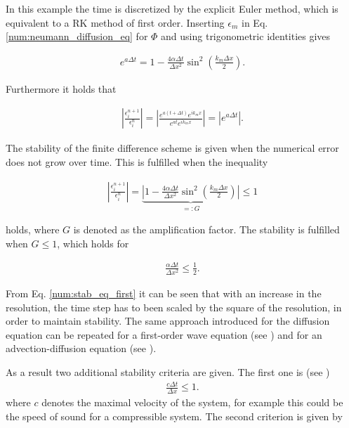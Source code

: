 In this example the time is discretized by the explicit Euler method, which is equivalent to a RK method of first order.
Inserting $\epsilon_m$ in Eq. \ref{num:neumann_diffusion_eq} for $\Phi$ and using trigonometric identities  gives

\begin{align}
    e^{a \Delta t} = 1 -  \frac{4\alpha \Delta t}{\Delta x^2} \sin^2\left(\frac{k_m \Delta x}{2}\right).
\end{align}

Furthermore it holds that

\begin{align}
    \left|\frac{\epsilon_i^{n+1}}{\epsilon_i^n}\right| =
    \left|\frac{e^{a(t + \Delta t)}e^{ik_mx}}{ e^{at}e^{ik_m x}}\right| = \left|e^{a\Delta t}\right|.
\end{align}

The stability of the finite difference scheme is given when the numerical error does not grow over time. This is fulfilled when the inequality

\begin{align}
    \label{num:stab_ineq}
    \left|\frac{\epsilon_i^{n+1}}{\epsilon_i^n}\right| =
    \underbrace{\left|1 -  \frac{4\alpha \Delta t}{\Delta x^2} \sin^2\left(\frac{k_m \Delta x}{2}\right)\right|}_{=:G} \leq 1
\end{align}

holds, where $G$ is denoted as the amplification factor. The stability is fulfilled when $G\leq1$, which holds for

\begin{align}
    \label{num:stab_eq_first}
   \frac{\alpha \Delta t}{\Delta x^2} \leq \frac{1}{2}.
\end{align}

From Eq. \ref{num:stab_eq_first} it can be seen that with an increase in the resolution,
the time step has to been scaled by the square of the resolution, in order to
maintain stability. The same approach introduced for the diffusion equation can be repeated for a first-order wave equation (see \citep{janderson})
and for an advection-diffusion equation (see \citep{ferziger99}).

As a result two additional stability criteria are given.
The first one is (see \citep{janderson})
\begin{align}
    \label{num:stab_soundspeed}
   \frac{c \Delta t}{\Delta x} \leq 1.
\end{align}
where $c$ denotes the maximal velocity of the system, for example this could be the speed of sound for a compressible system.
The second criterion is given by

